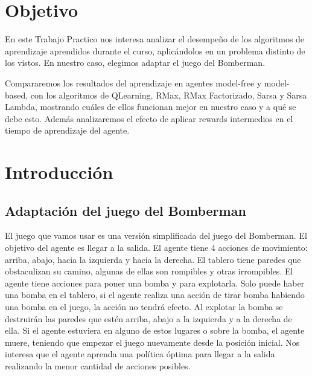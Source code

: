 \documentclass[a4paper,spanish] {article}
\begin{document}
\pagestyle{headings}



\newpage




\maketitle

\section{Objetivo}
	En  este Trabajo Practico nos interesa analizar el desempeño de los algoritmos de aprendizaje aprendidos durante el curso,  aplicándolos  en un problema distinto de los vistos. En nuestro caso, elegimos adaptar el juego del Bomberman. 
	
	Compararemos los resultados del aprendizaje en agentes model-free y model-based, con los algoritmos de QLearning, RMax, RMax Factorizado, Sarsa y Sarsa Lambda, mostrando cuáles de ellos funcionan mejor en nuestro caso y a qué se debe esto. Además analizaremos el efecto de aplicar rewards intermedios en el tiempo de aprendizaje del agente.

\section{Introducción}
	\subsection{Adaptación del juego del Bomberman}
	El juego que vamos usar es una versión simplificada del juego del Bomberman. El objetivo del agente es llegar a la salida. El agente tiene 4 acciones de movimiento: arriba, abajo, hacia la izquierda y hacia la derecha. El tablero tiene paredes que obstaculizan su camino, algunas de ellas son rompibles y otras irrompibles. El agente tiene acciones para poner una bomba y para explotarla. Solo puede haber una bomba en el tablero, si el agente realiza una acción de tirar bomba habiendo una bomba en el juego, la acción no tendrá efecto. Al explotar la bomba se destruirán las paredes que estén arriba, abajo a la izquierda y a la derecha de ella. Si el agente estuviera en alguno de estos lugares o sobre la bomba, el agente muere, teniendo que empezar el juego nuevamente desde la posición inicial. Nos interesa que el agente aprenda una política óptima para llegar a la salida realizando la menor cantidad de acciones posibles.
\end{document}

